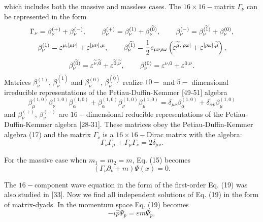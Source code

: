 \documentclass[a4paper,12pt]{article}
\begin{document}
which includes both the massive and massless cases. The $16\times 16-$matrix
$\Gamma _\nu $ can be represented in the form
\[
\Gamma _\nu =\beta _\nu ^{(+)}+\beta _\nu ^{(-)} ,
\hspace{0.3in}\beta _\nu ^{(+)}=\beta _\nu ^{(1)}+\beta _\nu
^{(\widetilde{0})} ,\hspace{0.3in}\beta _\nu ^{(-)}=\beta _\nu
^{(\widetilde{1})}+\beta _\nu ^{(0)} ,
\]
\begin{equation}
\beta _\nu ^{(1)}=\varepsilon ^{\mu ,[\mu \nu ]}+\varepsilon
^{[\mu \nu ],\mu } ,\hspace{0.3in}\beta _\nu
^{(\widetilde{1})}=\frac 12e_{\mu \nu \rho \omega }\left(
\varepsilon ^{\widetilde{\mu },[\rho \omega ]}+\varepsilon ^{[\rho
\omega ],\widetilde{\mu }}\right) , \label{16}
\end{equation}
\[
\beta _\nu ^{(\widetilde{0})}=\varepsilon ^{\widetilde{\nu
},\widetilde{0} }+\varepsilon ^{\widetilde{0},\widetilde{\nu }} ,
\hspace{0.3in}\beta _\nu ^{(0)}=\varepsilon ^{\nu ,0}+\varepsilon
^{0,\nu } .
\]
Matrices $\beta _\nu ^{(1)}$, $\beta _\nu ^{(\widetilde{1})}$ and
$\beta _\nu ^{(0)}$, $\beta _\nu ^{(\widetilde{0})}$ realize $10-$
and $5-$ dimensional irreducible representations of the
Petiau-Duffin-Kemmer [49-51] algebra
\begin{equation}
\beta _\mu ^{(1,0)}\beta _\nu ^{(1,0)}\beta _\alpha ^{(1,0)}+\beta _\alpha
^{(1,0)}\beta _\nu ^{(1,0)}\beta _\mu ^{(1,0)}=\delta _{\mu \nu }\beta
_\alpha ^{(1,0)}+\delta _{\alpha \nu }\beta _\mu ^{(1,0)}  \label{17}
\end{equation}
and $\beta _\nu ^{(+)}$, $\beta _\nu ^{(-)}$ are $16-$dimensional reducible
representations of the Petiau-Duffin-Kemmer algebra [28-31]. These matrices
obey the Petiau-Duffin-Kemmer algebra (17) and the matrix $\Gamma _\nu $ is
a $16\times 16-$Dirac matrix with the algebra:
\begin{equation}
\Gamma _\nu \Gamma _\mu +\Gamma _\mu \Gamma _\nu =2\delta _{\mu
\nu } .\label{18}
\end{equation}

For the massive case when $m_1=m_2=m$, Eq. (15) becomes
\begin{equation}
\left( \Gamma _\nu \partial _\nu +m\right) \Psi (x)=0 .\label{19}
\end{equation}

The $16-$component wave equation in the form of the first-order Eq. (19) was
also studied in [33]. Now we find all independent solutions of Eq. (19) in
the form of matrix-dyads. In the momentum space Eq. (19) becomes
\begin{equation}
-i\widehat{p}\Psi _p=\varepsilon m\Psi _p , \label{20}
\end{equation}
\end{document}
